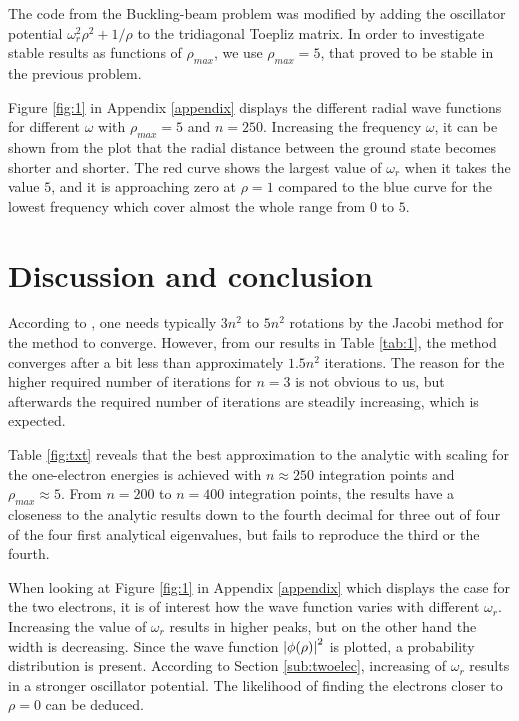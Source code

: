 \documentclass{article}
\begin{document}
The code from the Buckling-beam problem was modified by adding the oscillator potential $\omega_r^2\rho^2 + 1/\rho$ to the tridiagonal Toepliz matrix. In order to investigate stable results as functions of $\rho_{max}$, we use $\rho_{max} = 5$, that proved to be stable in the previous problem. 

\medskip

Figure \ref{fig:1} in Appendix \ref{appendix} displays the different radial wave functions for different $\omega$ with $\rho_{max} = 5$ and $n = 250$. Increasing the frequency $\omega$, it can be shown from the plot that the radial distance between the ground state becomes shorter and shorter. The red curve shows the largest value of $\omega_r$ when it takes the value $5$, and it is approaching zero at $\rho = 1$ compared to the blue curve for the lowest frequency which cover almost the whole range from $0$ to $5$.

\section{Discussion and conclusion}\label{sec:conc}

According to \cite{CompPhys}, one needs typically $3n^2$ to $5n^2$ rotations by the Jacobi method for the method to converge. However, from our results in Table \ref{tab:1}, the method converges after a bit less than approximately $1.5n^2$ iterations. The reason for the higher required number of iterations for $n = 3$ is not obvious to us, but afterwards the required number of iterations are steadily increasing, which is expected. 

\medskip

Table \ref{fig:txt} reveals that the best approximation to the analytic with scaling for the one-electron energies is achieved with $n \approx 250$ integration points and $\rho_{max} \approx 5$. From $n = 200$ to $n = 400$ integration points, the results have a closeness to the analytic results down to the fourth decimal for three out of four of the four first analytical eigenvalues, but fails to reproduce the third or the fourth.  

\medskip

When looking at Figure \ref{fig:1} in Appendix \ref{appendix} which displays the case for the two electrons, it is of interest how the wave function varies with different $\omega_r$. Increasing the value of $\omega_r$ results in higher peaks, but on the other hand the width is decreasing. Since the wave function $\abs{\phi(\rho)}^2$ is plotted, a probability distribution is present. According to Section \ref{sub:twoelec}, increasing of $\omega_r$ results in a stronger oscillator potential. The likelihood of finding the electrons closer to $\rho = 0$ can be deduced. 
\end{document}

